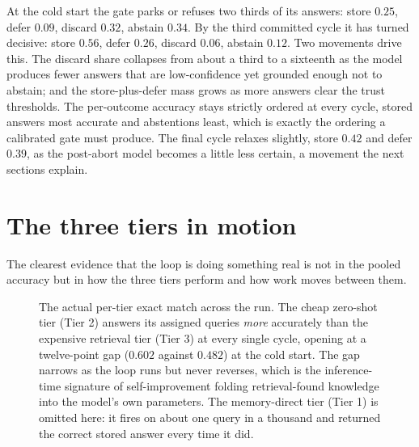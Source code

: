 \begin{precise}
At the cold start the gate parks or refuses two thirds of its answers: store $0.25$,
defer $0.09$, discard $0.32$, abstain $0.34$. By the third committed cycle it has
turned decisive: store $0.56$, defer $0.26$, discard $0.06$, abstain $0.12$. Two
movements drive this. The discard share collapses from about a third to a sixteenth as
the model produces fewer answers that are low-confidence yet grounded enough not to
abstain; and the store-plus-defer mass grows as more answers clear the trust
thresholds. The per-outcome accuracy stays strictly ordered at every cycle, stored
answers most accurate and abstentions least, which is exactly the ordering a
calibrated gate must produce. The final cycle relaxes slightly, store $0.42$ and defer
$0.39$, as the post-abort model becomes a little less certain, a movement the next
sections explain.
\end{precise}

\section{The three tiers in motion}
\label{sec:traj-tiers}

The clearest evidence that the loop is doing something real is not in the pooled
accuracy but in how the three tiers perform and how work moves between them.

\begin{figure}[htbp]
\centering
{}
\caption[Per-tier exact match: the distillation receipt]{The actual per-tier exact
match across the run. The cheap zero-shot tier (Tier 2) answers its assigned queries
\emph{more} accurately than the expensive retrieval tier (Tier 3) at every single
cycle, opening at a twelve-point gap ($0.602$ against $0.482$) at the cold start. The
gap narrows as the loop runs but never reverses, which is the inference-time signature
of self-improvement folding retrieval-found knowledge into the model's own parameters.
The memory-direct tier (Tier 1) is omitted here: it fires on about one query in a
thousand and returned the correct stored answer every time it did.}
\label{fig:traj-tiers}
\end{figure}

